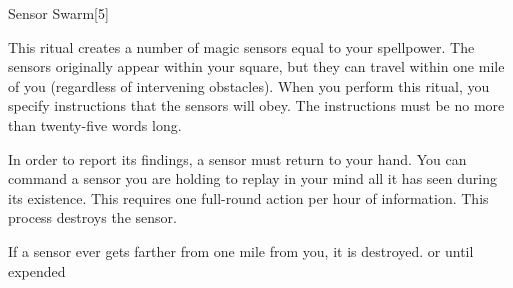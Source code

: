 \begin{spellsection}{Sensor Swarm}[5]
    \begin{spellheader}
    \end{spellheader}
    \begin{spellcontent}
        \begin{spelltargetinginfo}
        \end{spelltargetinginfo}
        \begin{spelleffects}
            \spelleffect This ritual creates a number of magic sensors equal to your spellpower.
            The sensors originally appear within your square, but they can travel within one mile of you (regardless of intervening obstacles).
            When you perform this ritual, you specify instructions that the sensors will obey.
            The instructions must be no more than twenty-five words long.

            \par In order to report its findings, a sensor must return to your hand. You can command a sensor you are holding to replay in your mind all it has seen during its existence. This requires one full-round action per hour of information. This process destroys the sensor.

            \par If a sensor ever gets farther from one mile from you, it is destroyed.
            \spelldur \durext or until expended \dismissable
        \end{spelleffects}
    \end{spellcontent}
    \begin{spellfooter}
        \spellnotes {}
    \end{spellfooter}
    \begin{spellaugments}
    \end{spellaugments}
\end{spellsection}

